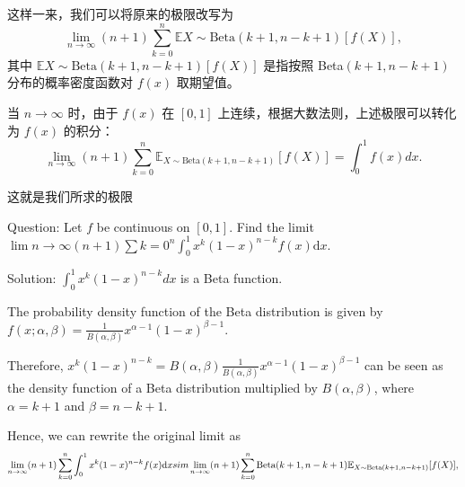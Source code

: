 \documentclass[a4paper,11pt,UTF8]{article}
\begin{document}
这样一来，我们可以将原来的极限改写为
$$
\lim_{n \rightarrow \infty} (n+1) \sum_{k=0}^n \mathbb{E}{X \sim \text{Beta}(k+1, n-k+1)}[f(X)],
$$
其中 $\mathbb{E}{X \sim \text{Beta}(k+1, n-k+1)}[f(X)]$ 是指按照 Beta$(k+1, n-k+1)$ 分布的概率密度函数对 $f(x)$ 取期望值。

当 $n \rightarrow \infty$ 时，由于 $f(x)$ 在 $[0, 1]$ 上连续，根据大数法则，上述极限可以转化为 $f(x)$ 的积分：
$$
\lim_{n \rightarrow \infty} (n+1) \sum_{k=0}^n \mathbb{E}_{X \sim \text{Beta}(k+1, n-k+1)}[f(X)] = \int_0^1 f(x) dx.
$$

这就是我们所求的极限


Question: Let $f$ be continuous on $[0,1]$. Find the limit $\lim {n \rightarrow \infty}(n+1) \sum{k=0}^n \int_0^1 x^k(1-x)^{n-k} f(x) \mathrm{d} x$.

Solution: $\int_0^1 x^k (1-x)^{n-k} dx$ is a Beta function.

The probability density function of the Beta distribution is given by $f(x; \alpha, \beta) = \frac{1}{B(\alpha, \beta)} x^{\alpha - 1} (1 - x)^{\beta - 1}$.

Therefore, $x^k (1-x)^{n-k} = B(\alpha, \beta)\frac{1}{B(\alpha, \beta)} x^{\alpha - 1} (1 - x)^{\beta - 1}$ can be seen as the density function of a Beta distribution multiplied by $B(\alpha, \beta)$, where $\alpha = k + 1$ and $\beta = n - k + 1$.

Hence, we can rewrite the original limit as
$$
\lim_{n \rightarrow \infty} (n+1) \sum_{k=0}^n \int_0^1 x^k(1-x)^{n-k} f(x) \mathrm{d} x \\sim\lim_{n \rightarrow \infty} (n+1) \sum_{k=0}^n \text{Beta}(k+1, n-k+1)\mathbb{E}_{X \sim \text{Beta}(k+1, n-k+1)}[f(X)],
$$
\end{document}

